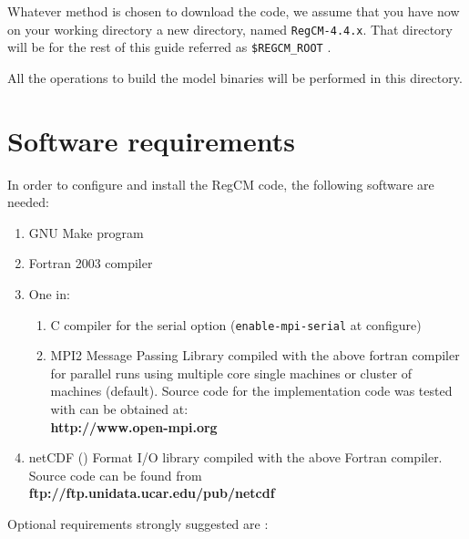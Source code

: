 %
%

Whatever method is chosen to download the code, we assume that you have now
on your working directory a new directory, named \verb=RegCM-4.4.x=.
That directory will be for the rest of this guide referred as 
\verb=$REGCM_ROOT= .

All the operations to build the model binaries will be performed in this
directory.

\section{Software requirements}

In order to configure and install the RegCM code, the following software are
needed:

\begin{enumerate}
\item GNU Make program
\item Fortran 2003 compiler
\item One in:
  \begin{enumerate}
    \item C compiler for the serial option (\verb=enable-mpi-serial= at
      configure)
    \item MPI2 Message Passing Library compiled with the above fortran compiler
     for parallel runs using multiple core single machines or cluster of
     machines (default).  Source code for the implementation code was tested
     with can be obtained at: \\
     {\bf http://www.open-mpi.org}
  \end{enumerate}
\item netCDF (\cite{Rew_90}) Format I/O library compiled with the above
  Fortran compiler.  Source code can be found from \\
  {\bf ftp://ftp.unidata.ucar.edu/pub/netcdf} \\
\end{enumerate}

Optional requirements strongly suggested are :


